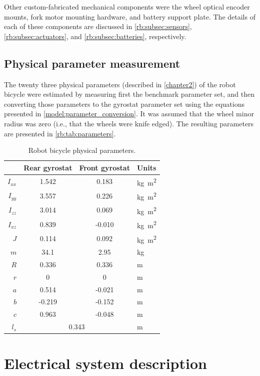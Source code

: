 Other custom-fabricated mechanical components were the wheel optical encoder
mounts, fork motor mounting hardware, and battery support plate. The details of
each of these components are discussed in \ref{rb:subsec:sensors},
\ref{rb:subsec:actuators}, and \ref{rb:subsec:batteries}, respectively.

\subsection{Physical parameter measurement} \label{rb:subsec:parameters}
The twenty three physical parameters (described in \autoref{chapter2}) of the
robot bicycle were estimated by measuring first the benchmark parameter set,
and then converting those parameters to the gyrostat parameter set using the
equations presented in \autoref{model:parameter_conversion}. It was assumed
that the wheel minor radius was zero (i.e., that the wheels were knife edged).
The resulting parameters are presented in \autoref{rb:tab:parameters}.
\begin{table}[htbp]
  \centering
  \begin{tabular}{rccl}
    \toprule
    & {Rear gyrostat} & {Front gyrostat} & {Units} \\
    \midrule
    $I_{xx}$ &  1.542 &   0.183 & \si{\kg\m\squared} \\
    $I_{yy}$ &  3.557 &   0.226 & \si{\kg\m\squared} \\
    $I_{zz}$ &  3.014 &   0.069 & \si{\kg\m\squared} \\
    $I_{xz}$ &  0.839 &  -0.010 & \si{\kg\m\squared} \\
         $J$ &  0.114 &   0.092 & \si{\kg\m\squared} \\
         $m$ & 34.1   &   2.95  & \si{\kg}     \\
         $R$ &  0.336 &   0.336 & \si{\m}      \\
         $r$ &  0     &   0     & \si{\m}\\
         $a$ &  0.514 &  -0.021 & \si{\m}\\
         $b$ & -0.219 &  -0.152 & \si{\m}\\
         $c$ &  0.963 &  -0.048 & \si{\m}\\
         $l_s$ & \multicolumn{2}{c}{0.343} &  \si{\m} \\
    \bottomrule
  \end{tabular}
  \caption{Robot bicycle physical parameters.}
  \label{rb:tab:parameters}
\end{table}
\section{Electrical system description} \label{rb:sec:elec}
